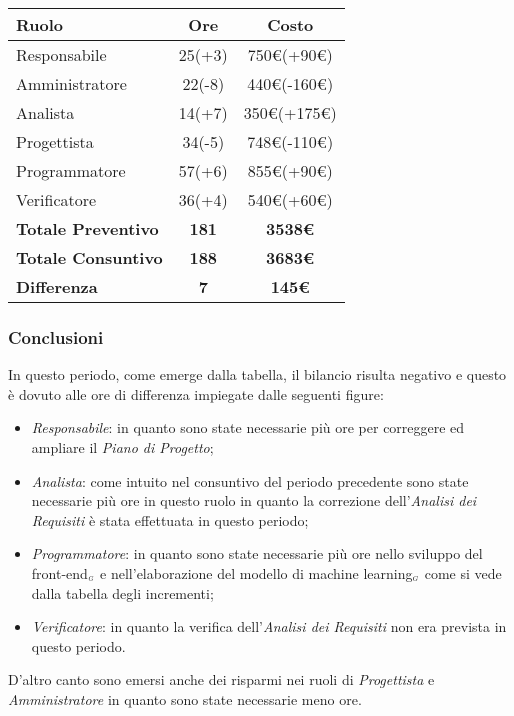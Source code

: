 {{{{{{{{{	\quad
	\def\tabularxcolumn#1{m{#1}}
	{
		\begin{center}
			\renewcommand{\arraystretch}{1.4}
			\begin{tabularx}{10cm}{|X|c|c|}
				\hline
				\rowcolor{airforceblue}
				\textbf{Ruolo} & \textbf{Ore} & \textbf{Costo}\\
				\hline
				Responsabile & 25(+3) & 750\euro(+90\euro)\\
				\hline
				Amministratore & 22(-8) & 440\euro(-160\euro)\\
				\hline
				Analista & 14(+7) & 350\euro(+175\euro)\\
				\hline
				Progettista & 34(-5) & 748\euro(-110\euro)\\
				\hline
				Programmatore & 57(+6) & 855\euro(+90\euro)\\
				\hline
				Verificatore & 36(+4) & 540\euro(+60\euro)\\
				\hline
				\textbf{Totale Preventivo} & \textbf{181} & \textbf{3538\euro}\\
				\hline
				\textbf{Totale Consuntivo} & \textbf{188} & \textbf{3683\euro}\\
				\hline
				\textbf{Differenza} & \textbf{7} & \textbf{145\euro}
			\end{tabularx}
		\end{center}
		
	\subsubsection{Conclusioni}\label{ConsuntivoSecondoPeriodoDiProgettazioneDiDettaglioCodificaConclusioni}
		In questo periodo, come emerge dalla tabella, il bilancio risulta negativo e questo è dovuto alle ore di differenza impiegate dalle seguenti figure: 
		\begin{itemize}
			\item \textit{Responsabile}: in quanto sono state necessarie più ore per correggere ed ampliare il \textit{Piano di Progetto};
			\item \textit{Analista}: come intuito nel consuntivo del periodo precedente sono state necessarie più ore in questo ruolo in quanto la correzione dell'\textit{Analisi dei Requisiti} è stata effettuata in questo periodo;
			\item \textit{Programmatore}: in quanto sono state necessarie più ore nello sviluppo del front-end$_{\scaleto{G}{3pt}}$ e nell'elaborazione del modello di machine learning$_{\scaleto{G}{3pt}}$ come si vede dalla tabella degli incrementi;
			\item \textit{Verificatore}: in quanto la verifica dell'\textit{Analisi dei Requisiti} non era prevista in questo periodo.
		\end{itemize}
		D'altro canto sono emersi anche dei risparmi nei ruoli di \textit{Progettista} e \textit{Amministratore} in quanto sono state necessarie meno ore.
		
}}}}}}}}}}

